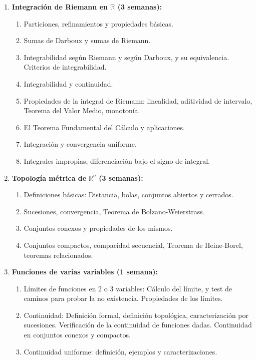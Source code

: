 \begin{refsection}
\begin{enumerate}
\item \textbf{Integración de Riemann en $\mathbb{R}$ (3 semanas):} 
\begin{enumerate}
    \item Particiones, refinamientos y propiedades básicas.
    \item Sumas de Darboux y sumas de Riemann.
    \item Integrabilidad según Riemann y según Darboux, y su equivalencia. Criterios de integrabilidad.
    \item Integrabilidad y continuidad.
    \item Propiedades de la integral de Riemann: linealidad, aditividad de intervalo, Teorema del Valor Medio, monotonía. 
    \item El Teorema Fundamental del Cálculo y aplicaciones. 
    \item Integración y convergencia uniforme.
    \item Integrales impropias, diferenciación bajo el signo de integral.
\end{enumerate}

\item \textbf{Topología métrica de} $\mathbb{R}^n$ \textbf{(3 semanas):}
\begin{enumerate}
\item Definiciones b\'asicas: Distancia, bolas, conjuntos abiertos y cerrados.
\item Sucesiones, convergencia, Teorema de Bolzano-Weierstrass.
\item Conjuntos conexos y propiedades de los mismos.
\item Conjuntos compactos, compacidad secuencial, Teorema de Heine-Borel, teoremas relacionados.
\end{enumerate}

\item \textbf{Funciones de varias variables (1 semana):}
\begin{enumerate}
\item Límites de funciones en 2 o 3 variables: C\'alculo del l\'imite, y test de caminos para probar la no existencia. Propiedades de los límites.
\item Continuidad: Definición formal, definición topológica, caracterización por sucesiones.  Verificación de la continuidad de funciones dadas.  Continuidad en conjuntos conexos y compactos.
\item Continuidad uniforme: definición, ejemplos y caracterizaciones.
\end{enumerate}



\end{enumerate}
\end{refsection}
